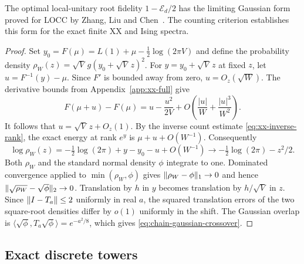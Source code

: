 The optimal local-unitary root fidelity $1-\mathcal E_d/2$ has the
limiting Gaussian form proved for LOCC by Zhang, Liu and
Chen~\cite[Supplement, Theorem~1]{ZhangLiuChen26}. The counting criterion
establishes this form for the exact finite XX and Ising spectra.

\begin{proof}
Set $y_0=F(\mu)=L(1)+\mu-\tfrac12\log(2\pi V)$ and define the
probability density $\rho_W(z)=\sqrt V\,g(y_0+\sqrt V\,z)^2$.
For $y=y_0+\sqrt V\,z$ at fixed $z$, let $u=F^{-1}(y)-\mu$.
Since $F'$ is bounded away from zero, $u=O_z(\sqrt W)$.
The derivative bounds from Appendix~\ref{app:xx-full} give
\[
 F(\mu+u)-F(\mu)=u-\frac{u^2}{2V}
              +O\left(\frac{|u|}{W}+\frac{|u|^3}{W^2}\right).
\]
It follows that $u=\sqrt V\,z+O_z(1)$. By the inverse count estimate
\eqref{eq:xx-inverse-rank}, the exact energy at rank $e^y$ is
$\mu+u+O(W^{-1})$. Consequently
\[
 \log\rho_W(z)=-\tfrac12\log(2\pi)+y-y_0-u+O(W^{-1})
              \longrightarrow-\tfrac12\log(2\pi)-z^2/2.
\]
Both $\rho_W$ and the standard normal density $\phi$ integrate to one.
Dominated convergence applied to $\min(\rho_W,\phi)$ gives
$\lVert \rho_W-\phi\rVert_1\to0$ and hence
$\lVert \sqrt{\rho_W}-\sqrt\phi\rVert_2\to0$. Translation by $h$ in $y$
becomes translation by $h/\sqrt V$ in $z$. Since $\lVert I-T_a\rVert\le2$
uniformly in real $a$, the squared translation errors of the two
square-root densities differ by $o(1)$ uniformly in the shift.
The Gaussian overlap is
$\langle\sqrt\phi,T_a\sqrt\phi\rangle=e^{-a^2/8}$, which gives
\eqref{eq:chain-gaussian-crossover}.
\end{proof}

\subsection{Exact discrete towers}

